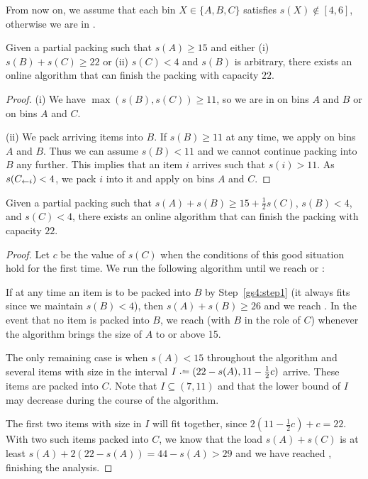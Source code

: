 From now on, we assume that each bin $X\in\{A,B,C\}$ satisfies $s(X) \not\in [4,6]$, otherwise we are in .

\begin{goodsit}\label{lem:gs3}
Given a partial packing such that $s(A) \ge 15$ and either
{\rm(i)} $s(B)+s(C)\ge 22$ or
{\rm(ii)} $s(C)<4$ and $s(B)$ is arbitrary,
there exists an online algorithm that can finish the packing with capacity $22$.
\end{goodsit}

\begin{proof}
(i) We have
$\max(s(B),s(C))\ge11$, so 
we are in  on bins
$A$ and $B$ or on bins $A$ and $C$. %

(ii) We pack arriving items into $B$. If $s(B) \geq
11$ at any time, we apply  on bins $A$ and $B$. Thus we can
assume $s(B) < 11$ and we cannot continue packing into $B$ any
further. This implies that an item $i$ arrives such that $s(i) >
11$. As $s(C_{\leftarrow i})<4$, we pack $i$ into it and apply  on
bins $A$ and $C$.
\end{proof}

\begin{goodsit}\label{lem:gs4}
Given a partial packing such that 
$s(A) +s(B) \geq 15+\frac{1}{2}s(C)$, $s(B) < 4$, and $s(C) < 4$,
there exists an online algorithm that can finish the packing with capacity $22$.
\end{goodsit}

\begin{proof}
Let $c$ be the value of $s(C)$ when the conditions of this good situation
hold for the first time.
We run the following algorithm until we reach  or :

\smallskip
{}
\medskip

If at any time an item is to be packed into $B$ by Step~\ref{gs4:step1} (it always fits since we maintain $s(B) < 4$),
then $s(A)+s(B)\ge 26$ and we reach . In the event that no item
is packed into $B$, we reach  (with $B$ in the role of $C$) whenever the algorithm brings the size
of $A$ to or above 15.

The only remaining case is when $s(A)<15$ throughout the algorithm and
several items with size in the interval $I \defeq
(22-s(A),11-\frac{1}{2}c)$ arrive. These items are packed into $C$.
Note that $I \subseteq (7,11)$ and that the lower bound of $I$ may decrease
during the course of the algorithm.

The first two items with size in $I$ will fit together,
since $2(11-\frac{1}{2}c) + c = 22$. With two such items packed into $C$, we know that the load $s(A) + s(C)$ is at least $s(A) + 2(22-s(A)) = 44 - s(A) > 29$ and we have reached , finishing the analysis.

\end{proof}

